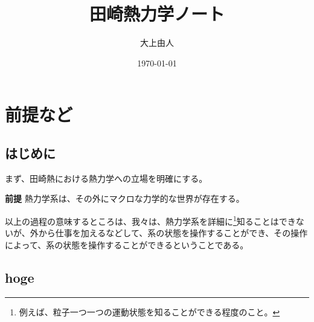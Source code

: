 \documentclass[a4paper,11pt]{jsarticle}
\begin{document}
\title{田崎熱力学ノート}
\author{大上由人}
\date{\today}
\maketitle

\section{前提など}
\subsection{はじめに}
まず、田崎熱における熱力学への立場を明確にする。\\
\begin{itembox}[l]{\textbf{前提}}
    熱力学系は、その外にマクロな力学的な世界が存在する。

\end{itembox}
以上の過程の意味するところは、我々は、熱力学系を詳細に\footnote[1]{例えば、粒子一つ一つの運動状態を知ることができる程度のこと。}知ることはできないが、外から仕事を加えるなどして、系の状態を操作することができ、その操作によって、系の状態を操作することができるということである。\\

\subsection{hoge}
\end{document}
